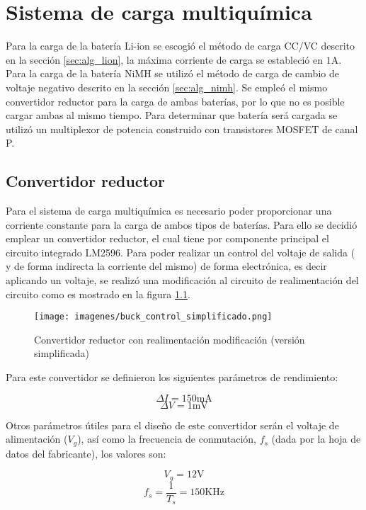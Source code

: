 \chapter{Sistema de carga multiquímica}

Para la carga de la batería Li-ion se escogió el método de carga CC/VC
descrito en la sección \ref{sec:alg_lion}, la máxima corriente de carga
se estableció en $1\text{A}$. Para la carga de la batería NiMH se utilizó
el método de carga de cambio de voltaje negativo descrito en la sección 
\ref{sec:alg_nimh}. Se empleó el mismo convertidor reductor para la carga
de ambas baterías, por lo que no es posible cargar ambas al mismo tiempo.
Para determinar que batería será cargada se utilizó un multiplexor de potencia
construido con transistores MOSFET de canal P.


\section{Convertidor reductor}

\label{sec:buck_design}

Para el sistema de carga multiquímica es necesario poder proporcionar una 
corriente constante para la carga de ambos tipos de baterías. Para ello
se decidió emplear un convertidor reductor, el cual tiene por componente principal
el circuito integrado LM2596. Para poder realizar un control del voltaje de salida ( y de
forma indirecta la corriente del mismo)
de forma electrónica, es decir aplicando un voltaje, se realizó una modificación al circuito
de realimentación del circuito como es mostrado en la figura \ref{fig:buck_modificado}.

\begin{figure}[H]
    \centering
    \texttt{[image: imagenes/buck\_control\_simplificado.png]}
    \caption{Convertidor reductor con realimentación modificación (versión simplificada) }
    \label{fig:buck_modificado}
\end{figure}

Para este convertidor se definieron los siguientes parámetros de rendimiento:

$$ \Delta I = 150 \text{mA} $$
$$ \Delta V = 1 \text{mV}$$

Otros parámetros útiles para el diseño de este convertidor serán el voltaje
de alimentación ($V_g$), así como la frecuencia de conmutación, $f_s$ (dada por la hoja 
de datos del fabricante), los valores son:

$$V_g = 12\text{V}$$
$$ f_s = \frac{1}{T_s} = 150 \text{KHz}$$



